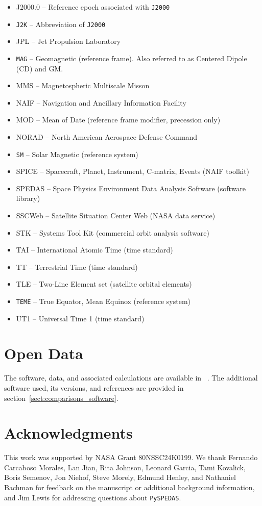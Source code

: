 \documentclass[draft]{agujournal2019}
\begin{document}
\begin{itemize}
\item J2000.0 -- Reference epoch associated with  \texttt{J2000}
\item  \texttt{J2K} -- Abbreviation of  \texttt{J2000}
\item JPL -- Jet Propulsion Laboratory
\item  \texttt{MAG} -- Geomagnetic (reference frame). Also referred to as Centered Dipole (CD) and GM.
\item MMS -- Magnetospheric Multiscale Misson 
\item NAIF -- Navigation and Ancillary Information Facility 
\item MOD -- Mean of Date (reference frame modifier, precession only)
\item NORAD -- North American Aerospace Defense Command
\item  \texttt{SM} -- Solar Magnetic (reference system)
\item SPICE -- Spacecraft, Planet, Instrument, C-matrix, Events (NAIF toolkit)
\item SPEDAS -- Space Physics Environment Data Analysis Software (software library)
\item SSCWeb -- Satellite Situation Center Web (NASA data service)
\item STK -- Systems Tool Kit (commercial orbit analysis software)
\item TAI -- International Atomic Time (time standard)
\item TT -- Terrestrial Time (time standard)
\item TLE -- Two-Line Element set (satellite orbital elements)
\item  \texttt{TEME} -- True Equator, Mean Equinox (reference system)
\item UT1 -- Universal Time 1 (time standard)
\end{itemize}

\section*{Open Data}

The software, data, and associated calculations are available in ~. The additional software used, its versions, and references are provided in section~\ref {sect:comparisons_software}.

\section*{Acknowledgments}

This work was supported by NASA Grant 80NSSC24K0199. We thank Fernando Carcaboso Morales, Lan Jian, Rita Johnson, Leonard Garcia, Tami Kovalick, Boris Semenov, Jon Niehof, Steve Morely, Edmund Henley, and Nathaniel Bachman for feedback on the manuscript or additional background information, and Jim Lewis for addressing questions about \texttt{PySPEDAS}. 

{\raggedright }
\end{document}
